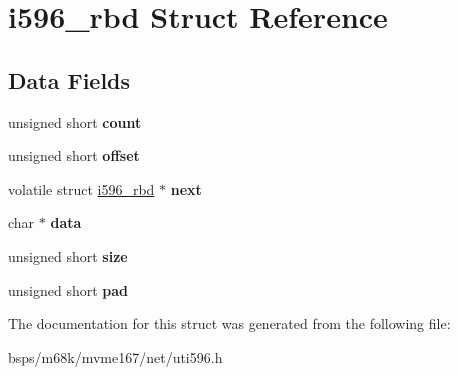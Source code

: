 \hypertarget{structi596__rbd}{}\section{i596\+\_\+rbd Struct Reference}
\label{structi596__rbd}
\subsection*{Data Fields}
\begin{DoxyCompactItemize}
\item 
\mbox{\label{structi596__rbd_adc207145306146b0ff7f8ec4b0fb1162}} 
unsigned short {\bfseries count}
\item 
\mbox{\label{structi596__rbd_a3a30dd10a88aa11562be4b76bcb7e7ea}} 
unsigned short {\bfseries offset}
\item 
\mbox{\label{structi596__rbd_a7bd8a27b10cc5ccbaf39fcc6c4e10544}} 
volatile struct \mbox{\hyperlink{structi596__rbd}{i596\+\_\+rbd}} $\ast$ {\bfseries next}
\item 
\mbox{\label{structi596__rbd_aad7c201fc6c500a547a343dec04446b7}} 
char $\ast$ {\bfseries data}
\item 
\mbox{\label{structi596__rbd_ae03af62759d327baf7ba6d5b3e184833}} 
unsigned short {\bfseries size}
\item 
\mbox{\label{structi596__rbd_a6817cad7388444102460e63680ae6d6f}} 
unsigned short {\bfseries pad}
\end{DoxyCompactItemize}


The documentation for this struct was generated from the following file\+:\begin{DoxyCompactItemize}
\item 
bsps/m68k/mvme167/net/uti596.\+h\end{DoxyCompactItemize}
